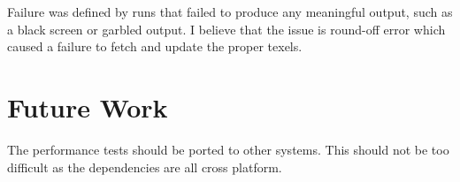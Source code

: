 \documentclass{article}
\begin{document}
Failure was defined by runs that failed to produce any meaningful output, such as a black screen or garbled output. I believe that the issue is round-off error which caused a failure to fetch and update the proper texels.

\section{Future Work}
The performance tests should be ported to other systems. This should not be too difficult as the dependencies are all cross platform.
\end{document}
